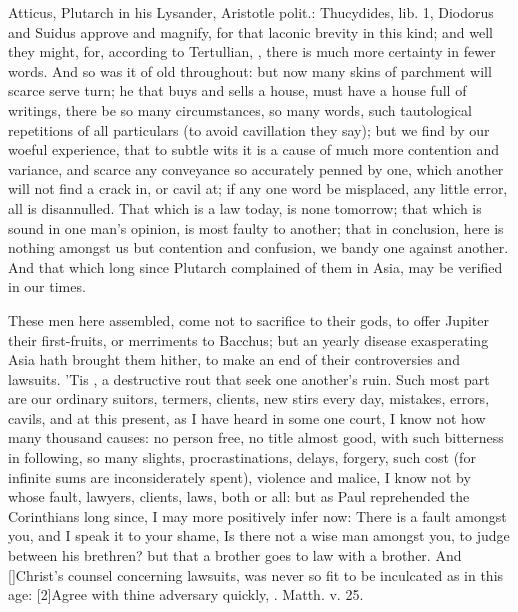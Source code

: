 {Atticus, Plutarch in his Lysander, Aristotle polit.: Thucydides, lib.
1, Diodorus and Suidus approve and magnify, for that laconic
brevity in this kind; and well they might, for, according to
Tertullian, , there is much more certainty in
fewer words. And so was it of old throughout: but now many skins of
parchment will scarce serve turn; he that buys and sells a house, must
have a house full of writings, there be so many circumstances, so many
words, such tautological repetitions of all particulars (to avoid
cavillation they say); but we find by our woeful experience, that to
subtle wits it is a cause of much more contention and variance, and
scarce any conveyance so accurately penned by one, which another will
not find a crack in, or cavil at; if any one word be misplaced, any
little error, all is disannulled. That which is a law today, is none
tomorrow; that which is sound in one man's opinion, is most faulty to
another; that in conclusion, here is nothing amongst us but contention
and confusion, we bandy one against another. And that which long since
Plutarch complained of them in Asia, may be verified in our times.

These men here assembled, come not to sacrifice to their gods, to offer
Jupiter their first-fruits, or merriments to Bacchus; but an yearly
disease exasperating Asia hath brought them hither, to make an end of
their controversies and lawsuits. 'Tis , a destructive rout that seek one another's ruin. Such most
part are our ordinary suitors, termers, clients, new stirs every day,
mistakes, errors, cavils, and at this present, as I have heard in some
one court, I know not how many thousand causes: no person free, no
title almost good, with such bitterness in following, so many slights,
procrastinations, delays, forgery, such cost (for infinite sums are
inconsiderately spent), violence and malice, I know not by whose fault,
lawyers, clients, laws, both or all: but as Paul reprehended the
Corinthians long since, I may more positively infer now: There is
a fault amongst you, and I speak it to your shame, Is there not a
wise man amongst you, to judge between his brethren? but that a
brother goes to law with a brother. And [\baselineskip]Christ's counsel
concerning lawsuits, was never so fit to be inculcated as in this age:
[2\baselineskip]Agree with thine adversary quickly, \etc{}. Matth. v. 25.

}
